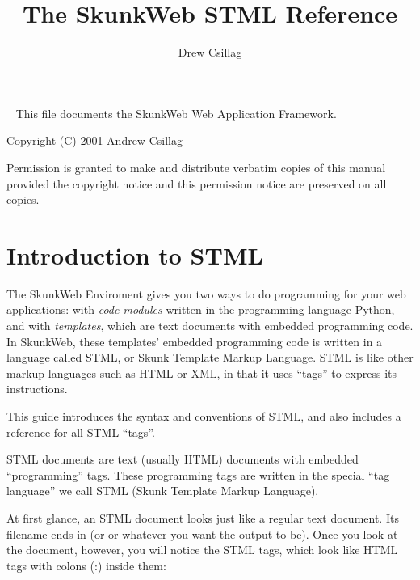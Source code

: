 \documentclass{manual}
\title{The SkunkWeb STML Reference}
\author{Drew Csillag}
\begin{document}
\newcommand{\argdescitem}[1]{\hspace\labelsep
                                \normalfont\ttfamily #1\ }
\newenvironment{argdesc}{\begin{list}{}{
        \renewcommand{\makelabel}{\argdescitem}
}
}{\end{list}}

\newcommand{\doref}[1]{(see section \ref{#1}, page \pageref{#1})}
\maketitle
\ 
\vfill 
\noindent
This file documents the SkunkWeb Web Application Framework.

\noindent
Copyright (C) 2001 Andrew Csillag

\noindent
Permission is granted to make and distribute verbatim copies of
this manual provided the copyright notice and this permission notice
are preserved on all copies.


\tableofcontents

\chapter{Introduction to STML}
\label{stmlrefintro}
The SkunkWeb Enviroment gives you two ways to do programming for your
web applications: with \emph{code modules} written in the programming
language Python, and with \emph{templates}, which are text documents
with embedded programming code. In SkunkWeb, these templates' embedded
programming code is written in a language called STML, or Skunk
Template Markup Language. STML is like other markup languages such as
HTML or XML, in that it uses ``tags'' to express its instructions.

This guide introduces the
syntax and conventions of STML, and also includes a reference
for all STML ``tags''.

STML documents are text (usually HTML) documents with 
embedded ``programming'' tags. These programming tags are 
written in the special ``tag language'' we call STML 
(Skunk Template Markup Language).

At first glance, an STML document looks just like 
a regular text document. Its filename ends in 
 (or  or whatever you want the 
output to be). Once you look at the document, however, 
you will notice the STML tags, which look like HTML 
tags with colons (:) inside them:
\end{document}
